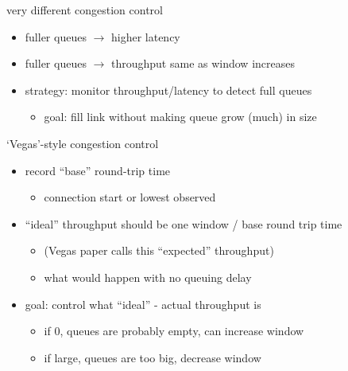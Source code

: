 \begin{frame}{very different congestion control}
    \begin{itemize}
    \item fuller queues $\rightarrow$ higher latency
    \item fuller queues $\rightarrow$ throughput same as window increases
    \vspace{.5cm}
    \item<2-> strategy: monitor throughput/latency to detect full queues
        \begin{itemize}
        \item goal: fill link without making queue grow (much) in size
        \end{itemize}
    \end{itemize}
\end{frame}

\begin{frame}{`Vegas'-style congestion control}
    \begin{itemize}
    \item record ``base'' round-trip time
        \begin{itemize}
        \item connection start or lowest observed
        \end{itemize}
    \item ``ideal'' throughput should be one window / base round trip time
        \begin{itemize}
        \item (Vegas paper calls this ``expected'' throughput)
        \item what would happen with no queuing delay
        \end{itemize}
    \vspace{.5cm}
    \item goal: control what ``ideal'' - actual throughput is
        \begin{itemize}
        \item if 0, queues are probably empty, can increase window
        \item if large, queues are too big, decrease window
        \end{itemize}
    \end{itemize}
\end{frame}

